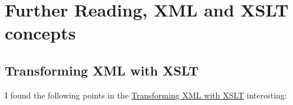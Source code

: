
%
\section{Further Reading, XML and XSLT concepts}
\label{sect:azad}
\subsection{Transforming XML with XSLT}
	I found the following points in the \href{http://oreilly.com/catalog/orxmlapp/chapter/ch07.pdf}{Transforming XML with XSLT} interesting:
